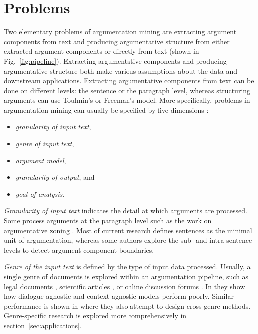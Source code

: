 \section{Problems}
\label{sec:problems}

Two elementary problems of argumentation mining are 
extracting argument components from text and producing argumentative structure
from either extracted argument components or directly from text
(shown in Fig.~\ref{fig:pipeline}). 
Extracting argumentative components and producing argumentative
structure both make various assumptions about the data and downstream
applications. 
Extracting argumentative components from text can be done on different levels:
the sentence or the paragraph level, whereas structuring arguments can use
Toulmin's or Freeman's model.
More specifically, problems in argumentation mining can
usually be specified by five dimensions \citep{lippi2016argumentation}: 
\begin{itemize}
\item \emph{granularity of input text}, 
\item \emph{genre of input text}, 
\item \emph{argument model}, 
\item \emph{granularity of output}, and
\item \emph{goal of analysis}.
\end{itemize}

\emph{Granularity of input text} indicates the detail at which arguments
are processed. Some process arguments at the paragraph level 
such as the work on argumentative zoning
\citep{teufel2009towards}. Most of current research defines
sentences as the minimal unit of argumentation,
whereas some authors explore the sub- and intra-sentence levels
to detect argument component boundaries.

\emph{Genre of the input text} is defined by the type of input data processed.
Usually, a single genre of documents is explored within an argumentation
pipeline, such as legal documents \citep{palau2009argumentation}, scientific
articles \citep{teufel2009towards}, or online discussion forums
\citep{hasan2014you, boltuzic2014back, habernal2017argumentation}.  In
\citep{budzynska2014towards} they show how dialogue-agnostic and
context-agnostic models perform poorly.  Similar performance is shown in
\citep{daxenberger2017essence} where they also attempt to design cross-genre
methods. Genre-specific research is explored more comprehensively in 
section~\ref{sec:applications}.

